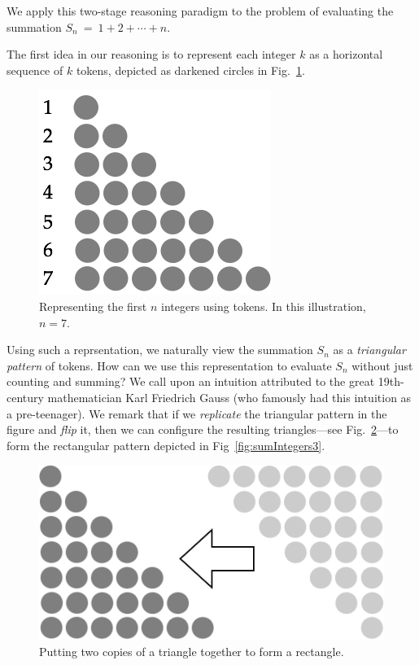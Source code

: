 We apply this two-stage reasoning paradigm to the problem of
evaluating the summation $S_n \ = \ 1 + 2 + \cdots + n$.

The first idea in our reasoning is to represent each integer $k$ as a
horizontal sequence of $k$ tokens, depicted as darkened circles in
Fig.~\ref{fig:sumIntegers1}.
\begin{figure}[ht]
\begin{center}
       \includegraphics[scale=0.4]{FiguresMaths/SumIntegersBasis}
\caption{Representing the first $n$ integers using tokens.  In
  this illustration, $n=7$.}
       \label{fig:sumIntegers1}
\end{center}
\end{figure}
Using such a reprsentation, we naturally view the summation $S_n$ as a
\textit{triangular pattern} of tokens.  How can we use this
representation to evaluate $S_n$ without just counting and summing?
We call upon an intuition attributed to the great 19th-century
mathematician Karl Friedrich Gauss 
(who famously had this intuition as a pre-teenager).  We remark that
if we {\em replicate} the triangular pattern in the figure and {\em
  flip} it, then we can configure the resulting triangles---see
Fig.~\ref{fig:sumIntegers2}---to form the rectangular pattern depicted
in Fig~\ref{fig:sumIntegers3}.
\begin{figure}[ht]
\begin{center}
       \includegraphics[scale=0.4]{FiguresMaths/SumIntegersIntermediate}
   \caption{Putting two copies of a triangle together to form a rectangle.}
       \label{fig:sumIntegers2}
\end{center}
\end{figure}
